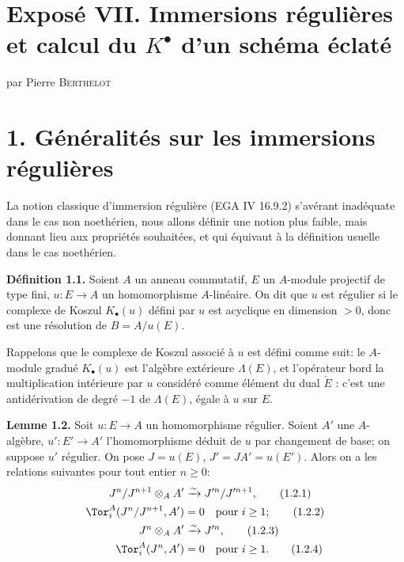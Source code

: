 \renewcommand{\Sym}{\operatorname{Sym}}
\renewcommand{\Projz}{\operatorname{Proj}_0}
\section*{Exposé VII. Immersions régulières et calcul du \texorpdfstring{$K^{\bullet}$}{K0} d'un schéma éclaté}
\begin{center}
par Pierre \textsc{Berthelot}
\end{center}

\section*{1. Généralités sur les immersions régulières}

La notion classique d'immersion régulière (EGA IV 16.9.2) s'avérant inadéquate dans le cas non noethérien, nous allons définir une notion plus faible, mais donnant lieu aux propriétés souhaitées, et qui équivaut à la définition usuelle dans le cas noethérien.

\textbf{Définition 1.1.} Soient $A$ un anneau commutatif, $E$ un $A$-module projectif de type fini, $u:E\longrightarrow A$ un homomorphisme $A$-linéaire. On dit que $u$ est régulier si le complexe de Koszul $K_\bullet(u)$ défini par $u$ est acyclique en dimension $>0$, donc est une résolution de $B=A/u(E)$.

Rappelons que le complexe de Koszul associé à $u$ est défini comme suit: le $A$-module gradué $K_\bullet(u)$ est l'algèbre extérieure $\Lambda(E)$, et l'opérateur bord la multiplication intérieure par $u$ considéré comme élément du dual $\check E$ : c'est une antidérivation de degré $-1$ de $\Lambda(E)$, égale à $u$ sur $E$.

\textbf{Lemme 1.2.} Soit $u:E\longrightarrow A$ un homomorphisme régulier. Soient $A'$ une $A$-algèbre, $u':E'\longrightarrow A'$ l'homomorphisme déduit de $u$ par changement de base; on suppose $u'$ régulier. On pose $J=u(E)$, $J'=JA'=u(E')$. Alors on a les relations suivantes pour tout entier $n\geq0$:
\begin{align}
 J^n/J^{n+1}\otimes_AA'&\xrightarrow{\sim}J'^n/J'^{n+1}, \tag{1.2.1}\\
 \Tor_i^A(J^n/J^{n+1},A')&=0\quad\text{pour }i\geq1; \tag{1.2.2}\\
 J^n\otimes_AA'&\xrightarrow{\sim}J'^n, \tag{1.2.3}\\
 \Tor_i^A(J^n,A')&=0\quad\text{pour }i\geq1. \tag{1.2.4}
\end{align}

